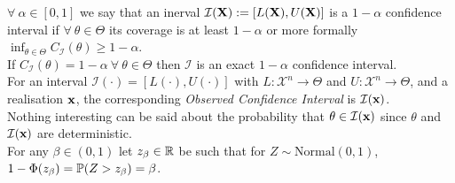 \documentclass[11pt,a4paper]{article}
\begin{document}
$\forall\ \alpha\in[0,1]$ we say that an inerval $\mathcal{I}(\textbf{X}):=[L(\textbf{X}),U(\textbf{X})]$ is a $1-\alpha$ confidence interval if $\forall\ \theta\in\Theta$ its coverage is at least $1-\alpha$ or more formally $\inf_{\theta\in\Theta}C_\mathcal{I}(\theta)\geq1-\alpha$.\\

If $C_\mathcal{I}(\theta)=1-\alpha\ \forall\ \theta\in\Theta$ then $\mathcal{I}$ is an exact $1-\alpha$ confidence interval.\\

For an interval $\mathcal{I}(\cdot)=[L(\cdot),U(\cdot)]$ with $L:\mathcal{X}^n\to\Theta$ and $U:\mathcal{X}^n\to\Theta$, and a realisation $\textbf{x}$, the corresponding \textit{Observed Confidence Interval} is $\mathcal{I}(\textbf{x})$.\\
\nb Nothing interesting can be said about the probability that $\theta\in\mathcal{I}(\textbf{x})$ since $\theta$ and $\mathcal{I}(\textbf{x})$ are deterministic.\\

For any $\beta\in(0,1)$ let $z_\beta\in\mathbb{R}$ be such that for $Z\sim\text{Normal}(0,1)$, $1-\Phi(z_\beta)=\mathbb{P}(Z>z_\beta)=\beta$.\\
\end{document}
